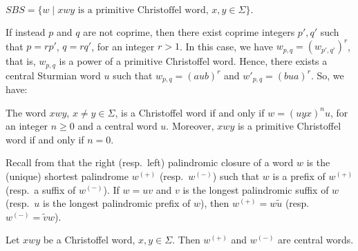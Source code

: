 \documentclass{llncs}
\newcommand{\SBS}{\textit{SBS}}
\begin{document}
\begin{theorem}\label{theor:sbsCP}
  $\SBS=\{w\mid xwy \mbox{ is a primitive Christoffel word, $x,y\in \Sigma\}$}.$
\end{theorem}

If instead $p$ and $q$ are not coprime, then there exist coprime integers $p',q'$ such that $p=rp'$, $q=rq'$, for an integer $r>1$. In this case, we have $w_{p,q}=(w_{p',q'})^{r}$, that is, $w_{p,q}$ is a power of a primitive Christoffel word. Hence, there exists a central Sturmian word $u$ such that $w_{p,q}=(aub)^{r}$ and $w'_{p,q}=(bua)^{r}$. So, we have:

\begin{lemma}\label{lem:npChris}
The word $xwy$, $x\neq y\in \Sigma$, is a Christoffel word if and only if $w=(uyx)^{n}u$, for an integer $n\ge 0$ and a central word $u$. Moreover, $xwy$ is a primitive Christoffel word if and only if $n=0$.
\end{lemma}

Recall from \cite{Del97} that the right (resp.~left) palindromic closure of a word $w$ is the (unique) shortest palindrome $w^{(+)}$ (resp.~$w^{(-)}$) such that $w$ is a prefix of $w^{(+)}$ (resp.~a suffix of $w^{(-)}$). If $w=uv$ and $v$ is the longest palindromic suffix of $w$ (resp.~$u$ is the longest palindromic prefix of $w$), then $w^{(+)}=w\tilde{u}$ (resp.~$w^{(-)}=\tilde{v}w$). 

\begin{lemma}\label{lem:rpl}
 Let $xwy$ be a Christoffel word, $x,y\in \Sigma$. Then  $w^{(+)}$ and  $w^{(-)}$ are central words.
\end{lemma}
\end{document}
